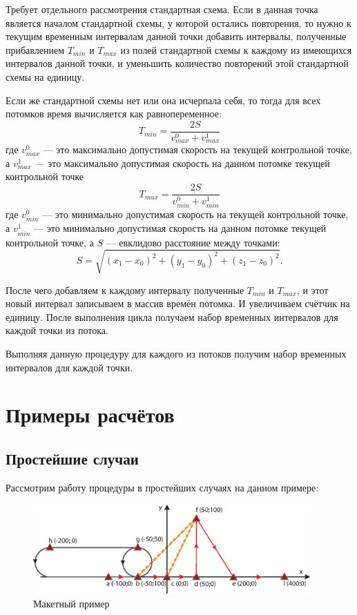 \documentclass[12pt]{article}
\theoremstyle{plain}
\begin{document}
Требует отдельного рассмотрения стандартная схема. Если в данная точка является началом стандартной схемы, у которой остались повторения, то нужно к текущим временным интервалам данной точки добавить интервалы, полученные прибавлением $T_{min}$ и $T_{max}$ из полей стандартной схемы к каждому из имеющихся интервалов данной точки, и уменьшить количество повторений этой стандартной схемы на единицу. 

Если же стандартной схемы нет или она исчерпала себя, то тогда для всех потомков время вычисляется как равнопеременное:
$$
  T_{min} = \frac{2S}{v_{max}^0 + v_{max}^1}
$$
где $v_{max}^0$ --- это максимально допустимая скорость на текущей контрольной точке, а $v_{max}^1$ --- это максимально допустимая скорость на данном потомке текущей контрольной точке
$$
  T_{max} = \frac{2S}{v_{min}^0 + v_{min}^1}
$$
где $v_{min}^0$ --- это минимально допустимая скорость на текущей контрольной точке, а $v_{min}^1$ --- это минимально допустимая скорость на данном потомке текущей контрольной точке, а $S$ --- евклидово расстояние между точками:
$$
  S = \sqrt{(x_1 - x_0)^2 + (y_1 - y_0)^2 + (z_1 - z_0)^2}.
$$

После чего добавляем к каждому интервалу полученные $T_{min}$ и $T_{max}$, и этот новый интервал записываем в массив времён потомка. И увеличиваем счётчик на единицу. После выполнения цикла получаем набор временных интервалов для каждой точки из потока.

Выполняя данную процедуру для каждого из потоков получим набор временных интервалов для каждой точки.


\newpage

\section{Примеры расчётов}

\subsection{Простейшие случаи}

Рассмотрим работу процедуры в простейших случаях на данном примере:

\begin{figure}[h]
  \begin{center}
      \includegraphics[width=0.95\textwidth]{Example.eps}
        \caption{Макетный пример}                                                                             
  \end{center}
\end{figure}
\end{document}
